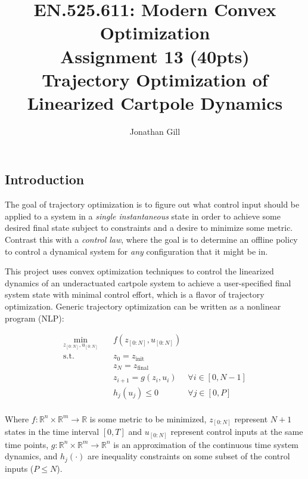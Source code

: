 \documentclass{exam}
\date{}
\title{EN.525.611: Modern Convex Optimization \\
	Assignment 13 (40pts) \\
    Trajectory Optimization of Linearized Cartpole Dynamics }
\author{Jonathan Gill}
\begin{document}
\maketitle

\begin{multicols}{2}
\section{Introduction}
The goal of trajectory optimization is to figure out what control input should be applied to a system in a \textit{single instantaneous} state in order to achieve some desired final state subject to constraints and a desire to minimize some metric. Contrast this with a \textit{control law}, where the goal is to determine an offline policy to control a dynamical system for \textit{any} configuration that it might be in.\par

This project uses convex optimization techniques to control the linearized dynamics of an underactuated cartpole system to achieve a user-specified final system state with minimal control effort, which is a flavor of trajectory optimization. Generic trajectory optimization can be written as a nonlinear program (NLP):

\begin{equation}
    \label{traj_opt_nlp}
    \begin{aligned}
        \min_{z_{[0:N]}, u_{[0:N]}} \quad & f(z_{[0:N]}, u_{[0:N]}) \\
        \textrm{s.t.} \quad & z_0 = z_{\textrm{init}} \\
        \quad & z_N = z_{\textrm{final}} \\
        \quad & z_{i+1} = g(z_i, u_i) ~& \forall i \in [0, N-1] \\
        \quad & h_j(u_j) \leq 0 ~& \forall j \in [0, P] \\
    \end{aligned}
\end{equation}

Where $f : \mathbb{R}^n \times \mathbb{R}^m \rightarrow \mathbb{R} $ is some metric to be minimized, $z_{[0:N]}$ represent $N + 1$ states in the time interval $[0, T]$ and $u_{[0:N]}$ represent control inputs at the same time points, $g : \mathbb{R}^n \times \mathbb{R}^m \rightarrow \mathbb{R}^n$ is an approximation of the continuous time system dynamics, and $h_j(\cdot)$ are inequality constraints on some subset of the control inputs ($P \leq N$).

\end{multicols}
\end{document}
